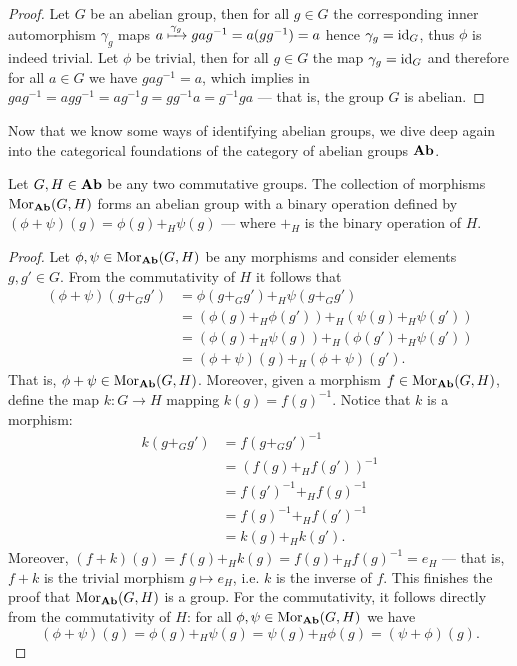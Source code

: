 \begin{proof}
Let \(G\) be an abelian group, then for all \(g \in G\) the corresponding inner
automorphism \(\gamma_g\) maps \(a \xmapsto{\gamma_g} g a g^{-1} = a (g g^{-1}) = a\)
hence \(\gamma_g = \operatorname{id}_G\), thus \(\phi\) is indeed trivial. Let \(\phi\) be trivial,
then for all \(g \in G\) the map \(\gamma_g = \operatorname{id}_G\) and therefore for all \(a \in G\)
we have \(g a g^{-1} = a\), which implies in \(g a g^{-1} = a g g^{-1} = a
g^{-1} g = g g^{-1} a = g^{-1} g a\) --- that is, the group \(G\) is abelian.
\end{proof}

Now that we know some ways of identifying abelian groups, we dive deep again
into the categorical foundations of the category of abelian groups \({\textbf{Ab}}\).

\begin{proposition}\label{prop: hom-ab-grp}
Let \(G, H \in {\textbf{Ab}}\) be any two commutative groups. The collection of
morphisms \(\operatorname{Mor}_{\textbf{Ab}}(G, H)\) forms an abelian group with a binary operation
defined by \((\phi + \psi)(g) = \phi(g) +_H \psi(g)\) --- where \(+_H\) is the
binary operation of \(H\).
\end{proposition}

\begin{proof}
Let \(\phi, \psi \in \operatorname{Mor}_{\textbf{Ab}}(G, H)\) be any morphisms and consider elements
\(g, g' \in G\). From the commutativity of \(H\) it follows that
\begin{align*}
  (\phi + \psi)(g +_G g')
  &= \phi(g +_G g') +_H \psi(g +_G g')
  \\
  &= \left(\phi(g) +_H \phi(g')\right) +_H \left(\psi(g) +_H \psi(g')\right)
  \\
  &= \left(\phi(g) +_H \psi(g)\right) +_H \left(\phi(g') +_H \psi(g')\right)
  \\
  &= (\phi + \psi)(g) +_H (\phi + \psi)(g').
\end{align*}
That is, \(\phi + \psi \in \operatorname{Mor}_{\textbf{Ab}}(G, H)\). Moreover, given a morphism \(f
\in \operatorname{Mor}_{\textbf{Ab}}(G, H)\), define the map \(k: G \to H\) mapping \(k(g) =
f(g)^{-1}\). Notice that \(k\) is a morphism:
\begin{align*}
  k(g +_G g')
  &= f(g +_G g')^{-1} \\
  &= (f(g) +_H f(g'))^{-1} \\
  &= f(g')^{-1} +_H f(g)^{-1} \\
  &= f(g)^{-1} +_H f(g')^{-1} \\
  &= k(g) +_H k(g').
\end{align*}
Moreover, \((f + k)(g) = f(g) +_H k(g) = f(g) +_H f(g)^{-1} = e_H\) --- that
is, \(f + k\) is the trivial morphism \(g \mapsto e_H\), i.e. \(k\) is the
inverse of \(f\). This finishes the proof that \(\operatorname{Mor}_{\textbf{Ab}}(G, H)\) is a group.
For the commutativity, it follows directly from the commutativity of \(H\):
for all \(\phi, \psi \in \operatorname{Mor}_{\textbf{Ab}}(G, H)\) we have
\[
  (\phi + \psi)(g) = \phi(g) +_H \psi(g) = \psi(g) +_H \phi(g) = (\psi +
  \phi)(g).
\]
\end{proof}


